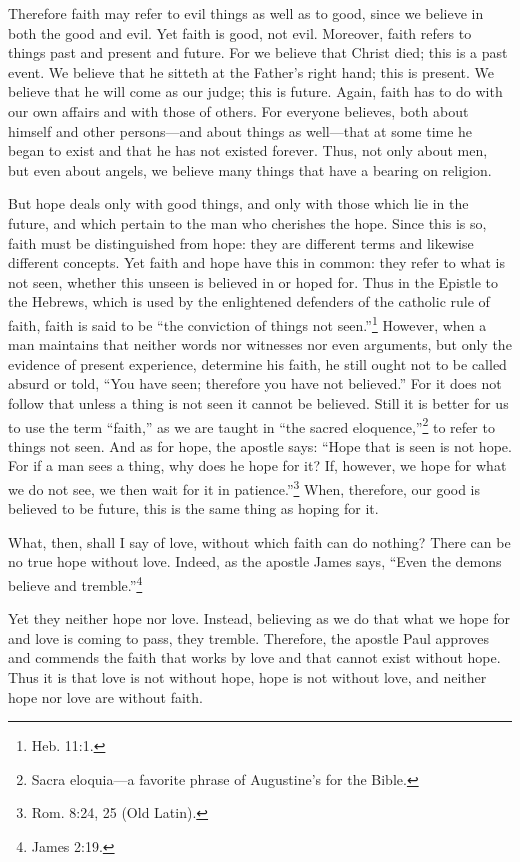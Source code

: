 Therefore faith may refer to evil things as well as to good, since we believe in both the good and evil. Yet faith is good, not evil. Moreover, faith refers to things past and present and future. For we believe that Christ died; this is a past event. We believe that he sitteth at the Father's right hand; this is present. We believe that he will come as our judge; this is future. Again, faith has to do with our own affairs and with those of others. For everyone believes, both about himself and other persons—and about things as well—that at some time he began to exist and that he has not existed forever. Thus, not only about men, but even about angels, we believe many things that have a bearing on religion.

But hope deals only with good things, and only with those which lie in the future, and which pertain to the man who cherishes the hope. Since this is so, faith must be distinguished from hope: they are different terms and likewise different concepts. Yet faith and hope have this in common: they refer to what is not seen, whether this unseen is believed in or hoped for. Thus in the Epistle to the Hebrews, which is used by the enlightened defenders of the catholic rule of faith, faith is said to be ``the conviction of things not seen.''\footnote{Heb. 11:1.} However, when a man maintains that neither words nor witnesses nor even arguments, but only the evidence of present experience, determine his faith, he still ought not to be called absurd or told, ``You have seen; therefore you have not believed.'' For it does not follow that unless a thing is not seen it cannot be believed. Still it is better for us to use the term ``faith,'' as we are taught in ``the sacred eloquence,''\footnote{Sacra eloquia—a favorite phrase of Augustine's for the Bible.} to refer to things not seen. And as for hope, the apostle says: ``Hope that is seen is not hope. For if a man sees a thing, why does he hope for it? If, however, we hope for what we do not see, we then wait for it in patience.''\footnote{Rom. 8:24, 25 (Old Latin).} When, therefore, our good is believed to be future, this is the same thing as hoping for it.

What, then, shall I say of love, without which faith can do nothing? There can be no true hope without love. Indeed, as the apostle James says, ``Even the demons believe and tremble.''\footnote{James 2:19.}

Yet they neither hope nor love. Instead, believing as we do that what we hope for and love is coming to pass, they tremble. Therefore, the apostle Paul approves and commends the faith that works by love and that cannot exist without hope. Thus it is that love is not without hope, hope is not without love, and neither hope nor love are without faith.

